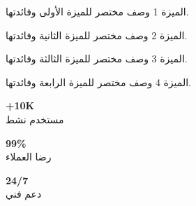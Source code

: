 \documentclass[11pt,a4paper]{article}
\begin{document}
\noindent
\begin{minipage}[t]{0.23\textwidth}
\begin{featurebox}{\LR{[Icon]} الميزة 1}
وصف مختصر للميزة الأولى وفائدتها.
\end{featurebox}
\end{minipage}\hfill
\begin{minipage}[t]{0.23\textwidth}
\begin{featurebox}{\LR{[Icon]} الميزة 2}
وصف مختصر للميزة الثانية وفائدتها.
\end{featurebox}
\end{minipage}\hfill
\begin{minipage}[t]{0.23\textwidth}
\begin{featurebox}{\LR{[Icon]} الميزة 3}
وصف مختصر للميزة الثالثة وفائدتها.
\end{featurebox}
\end{minipage}\hfill
\begin{minipage}[t]{0.23\textwidth}
\begin{featurebox}{\LR{[Icon]} الميزة 4}
وصف مختصر للميزة الرابعة وفائدتها.
\end{featurebox}
\end{minipage}

\vspace{0.5em}

\noindent
\begin{minipage}[t]{0.31\textwidth}
\begin{statbox}
\centering
{\Huge\bfseries +10K}\\[0.1em]
{\small مستخدم نشط}
\end{statbox}
\end{minipage}\hfill
\begin{minipage}[t]{0.31\textwidth}
\begin{statbox}
\centering
{\Huge\bfseries 99\%}\\[0.1em]
{\small رضا العملاء}
\end{statbox}
\end{minipage}\hfill
\begin{minipage}[t]{0.31\textwidth}
\begin{statbox}
\centering
{\Huge\bfseries 24/7}\\[0.1em]
{\small دعم فني}
\end{statbox}
\end{minipage}
\end{document}
